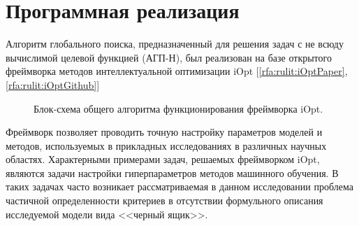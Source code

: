 \documentclass[a4paper,12pt,russian]{article}
\begin{document}
\section{Программная реализация} \label{iOpt_discr}

Алгоритм глобального поиска, предназначенный для решения задач с не всюду вычислимой целевой функцией (АГП-Н), был реализован на базе открытого фреймворка методов интеллектуальной оптимизации iOpt [\ref{rfa:rulit:iOptPaper},\ref{rfa:rulit:iOptGithub}]

\begin{figure}[h!]
	\caption{Блок-схема общего алгоритма функционирования фреймворка iOpt.}
	\label{fig_iOpt}
\end{figure}

Фреймворк позволяет проводить точную настройку параметров моделей и методов, используемых в прикладных исследованиях в различных научных областях. Характерными примерами задач, решаемых фреймворком iOpt, являются задачи настройки гиперпараметров методов машинного обучения. В таких задачах часто возникает рассматриваемая в данном исследовании проблема частичной определенности критериев в отсутствии формульного описания исследуемой модели вида <<черный ящик>>. 
\end{document}
